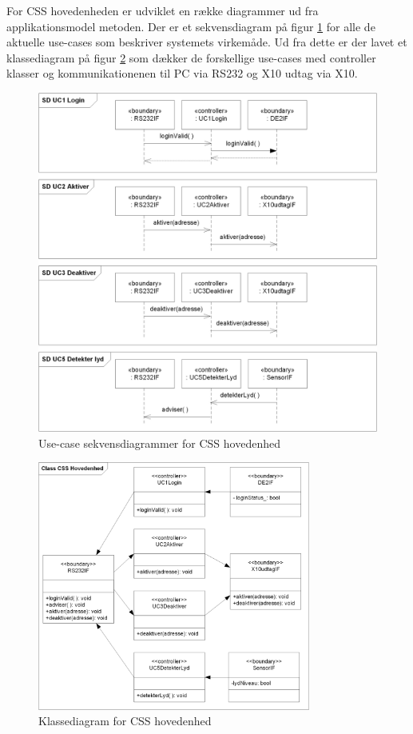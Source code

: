 For CSS hovedenheden er udviklet en række diagrammer ud fra applikationsmodel metoden.
Der er et sekvensdiagram på figur \ref{fig:CSS_hovedenhed_SD} for alle de aktuelle use-cases som beskriver systemets virkemåde.
Ud fra dette er der lavet et klassediagram på figur \ref{fig:CSS_hovedenhed_Class} som dækker de forskellige use-cases med controller klasser og kommunikationenen til PC via RS232 og X10 udtag via X10.


\begin{figure}[!htb]
	\includegraphics[width=\textwidth]{billeder/uml/CSS_hovedenhed_SD}
     \caption{Use-case sekvensdiagrammer for CSS hovedenhed}
     \label{fig:CSS_hovedenhed_SD}
\end{figure}

\begin{figure}[!htb] \centering
     \includegraphics[width=0.8\textwidth]{billeder/uml/CSS_hovedenhed_Class}
     \caption{Klassediagram for CSS hovedenhed}
     \label{fig:CSS_hovedenhed_Class}
\end{figure}
